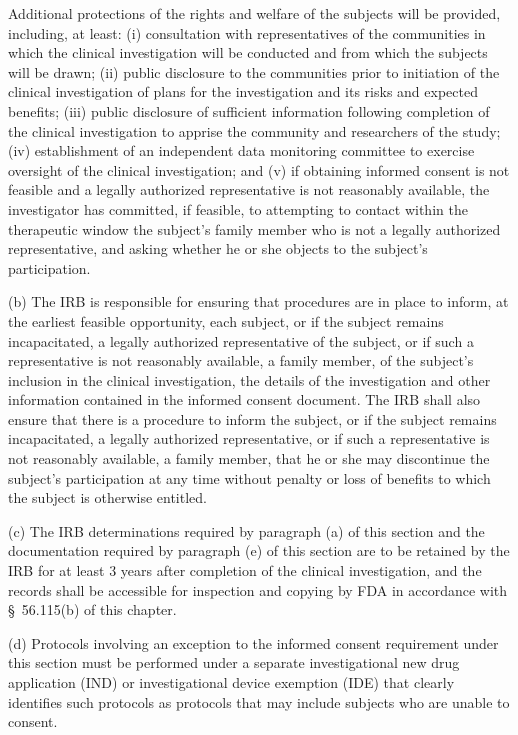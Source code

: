 \documentclass[11pt]{article}
\begin{document}
\begin{description}[leftmargin=1.0cm,style=sameline]
\item[(7)] Additional protections of the rights and welfare of the subjects will be provided, including, at least: (i) consultation with representatives of the communities in which the clinical investigation will be conducted and from which the subjects will be drawn; (ii) public disclosure to the communities prior to initiation of the clinical investigation of plans for the investigation and its risks and expected benefits; (iii) public disclosure of sufficient information following completion of the clinical investigation to apprise the community and researchers of the study; (iv) establishment of an independent data monitoring committee to exercise oversight of the clinical investigation; and (v) if obtaining informed consent is not feasible and a legally authorized representative is not reasonably available, the investigator has committed, if feasible, to attempting to contact within the therapeutic window the subject's family member who is not a legally authorized representative, and asking whether he or she objects to the subject's participation.
\end{description}

(b) The IRB is responsible for ensuring that procedures are in place to inform, at the earliest feasible opportunity, each subject, or if the subject remains incapacitated, a legally authorized representative of the subject, or if such a representative is not reasonably available, a family member, of the subject's inclusion in the clinical investigation, the details of the investigation and other information contained in the informed consent document. The IRB shall also ensure that there is a procedure to inform the subject, or if the subject remains incapacitated, a legally authorized representative, or if such a representative is not reasonably available, a family member, that he or she may discontinue the subject's participation at any time without penalty or loss of benefits to which the subject is otherwise entitled.

(c) The IRB determinations required by paragraph (a) of this section and the documentation required by paragraph (e) of this section are to be retained by the IRB for at least 3 years after completion of the clinical investigation, and the records shall be accessible for inspection and copying by FDA in accordance with \S~56.115(b) of this chapter.

(d) Protocols involving an exception to the informed consent requirement under this section must be performed under a separate investigational new drug application (IND) or investigational device exemption (IDE) that clearly identifies such protocols as protocols that may include subjects who are unable to consent.
\end{document}
